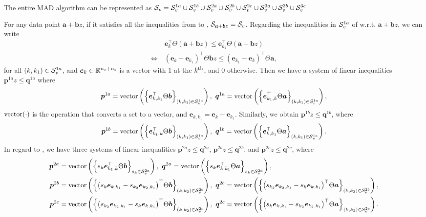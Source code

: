 The entire MAD algorithm can be represented as ${\mathcal S}_v = {\mathcal S}_v^{1a} \cup {\mathcal S}_v^{1b} \cup {\mathcal S}_v^{2a} \cup {\mathcal S}_v^{2b} \cup {\mathcal S}_v^{2c} \cup {\mathcal S}_v^{3a} \cup {\mathcal S}_v^{3b} \cup {\mathcal S}_v^{3c}$.

For any data point $\bm a + \bm b z$, if it satisfies all the inequalities from  to , ${\mathcal S}_{\bm a + \bm b z} = {\mathcal S}_v$.
%
Regarding the inequalities in ${\mathcal S}_v^{1a}$ of  w.r.t. $\bm a + \bm b z$, we can write 
%
\begin{align*}
	&\bm e_k^\top \Theta (\bm a + \bm b z) \leq \bm e_{k_1}^\top \Theta (\bm a + \bm b z) \\ 
	\Leftrightarrow ~
	& ( \bm e_k - \bm e_{k_1} )^\top \Theta \bm b z 
	\leq 
	( \bm e_{k_1} - \bm e_k )^\top \Theta \bm a,
\end{align*}
%
for all $(k, k_1) \in {\mathcal S}^{1a}_v$, and $\bm e_k \in \mathbb{R}^{n_s + n_t}$ is a vector with 1 at the $k^{\rm th}$, and 0 otherwise.
%
Then we have a system of linear inequalities $\bm p^{1a} z \leq \bm q^{1a}$ where 
%
\begin{align*}
	\bm p^{1a} = {\rm vector} \left( \Big \{ \bm e_{k, k_1}^\top \Theta \bm b \Big \}_{(k, k_1) \in {\mathcal S}^{1a}_v} \right), ~
	\bm q^{1a} = {\rm vector} \left( \Big \{ \bm e_{k_1, k}^\top \Theta \bm a \Big \}_{(k, k_1) \in {\mathcal S}^{1a}_v} \right),
\end{align*}
%
${\rm vector} (\cdot)$ is the operation that converts a set to a vector, and $\bm e_{k, k_1} = \bm e_k - \bm e_{k_1}$.
%
%
Similarly, we obtain $\bm p^{1b} z \leq \bm q^{1b}$, where
%
\begin{align*}
	\bm p^{1b} = {\rm vector} \left( \Big \{ \bm e_{k_1, k}^\top \Theta \bm b \Big \}_{(k, k_1) \in {\mathcal S}^{1a}_v} \right), ~
	\bm q^{1b} = {\rm vector} \left( \Big \{ \bm e_{k, k_1}^\top \Theta \bm a \Big \}_{(k, k_1) \in {\mathcal S}^{1a}_v} \right).
\end{align*}
%
In regard to , we have three systems of linear inequalities $\bm p^{2a} z \leq \bm q^{2a}$, $\bm p^{2b} z \leq \bm q^{2b}$, and $\bm p^{2c} z \leq \bm q^{2c}$, where 
%
\begin{align*}
	\bm p^{2a} & = {\rm vector} \left( \Big \{ s_k \bm e_{k_1, k}^\top \Theta \bm b \Big \}_{s_k \in {\mathcal S}^{2a}_v} \right), ~
	\bm q^{2a} = {\rm vector} \left( \Big \{ s_k \bm e_{k, k_1}^\top \Theta \bm a \Big \}_{s_k \in {\mathcal S}^{2a}_v} \right), \\ 
	\bm p^{2b} & = {\rm vector} \left( \Big \{ \big ( s_k \bm e_{k, k_1} - s_{k_2} \bm e_{k_2, k_1} \big )^\top \Theta \bm b \Big \}_{(k, k_2) \in {\mathcal S}^{2b}_v} \right), ~
	\bm q^{2b} = {\rm vector} \left( \Big \{ \big ( s_{k_2} \bm e_{k_2, k_1} - s_k \bm e_{k, k_1} \big )^\top \Theta \bm a \Big \}_{(k, k_2) \in {\mathcal S}^{2b}_v} \right), \\ 
	\bm p^{2c} & = {\rm vector} \left( \Big \{ \big (s_{k_2} \bm e_{k_2, k_1} - s_k \bm e_{k, k_1} \big )^\top \Theta \bm b \Big \}_{(k, k_2) \in {\mathcal S}^{2c}_v} \right), ~
	\bm q^{2c} = {\rm vector} \left( \Big \{ \big (s_k \bm e_{k, k_1} - s_{k_2} \bm e_{k_2, k_1} \big )^\top \Theta \bm a \Big \}_{(k, k_2) \in {\mathcal S}^{2c}_v} \right).
\end{align*}
